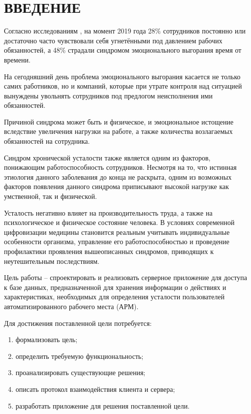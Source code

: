 \section*{ВВЕДЕНИЕ}

Согласно исследованиям \cite{burnout}, на момент 2019 года 28\% сотрудников постоянно или достаточно часто чувствовали себя угнетёнными под давлением рабочих обязанностей, а 48\% страдали синдромом эмоционального выгорания время от времени.

На сегодняшний день проблема эмоционального выгорания касается не только самих работников, но и компаний, которые при утрате контроля над ситуацией вынуждены увольнять сотрудников под предлогом неисполнения ими обязанностей. \cite{CompanyProblem}

Причиной синдрома может быть и физическое, и эмоциональное истощение вследствие увеличения нагрузки на работе, а также количества возлагаемых обязанностей на сотрудника. \cite{Prichini}

Синдром хронической усталости также является одним из факторов, понижающим работоспособность сотрудников. Несмотря на то, что истинная этиология данного заболевания до конца не раскрыта, одним из возможных факторов появления данного синдрома приписывают высокой нагрузке как умственной, так и физической. \cite{SHU}

Усталость негативно влияет на производительность труда, а также на психологическое и физическое состояние человека. В условиях современной цифровизации медицины становится реальным учитывать индивидуальные особенности организма, управление его работоспособностью и проведение профилактики проявления вышеописанных синдромов, приводящих к неутешительным последствиям.

Цель работы -- спроектировать и реализовать серверное приложение для доступа к базе данных, предназначенной для хранения информации о действиях и характеристиках, необходимых для определения усталости пользователей автоматизированного рабочего места (АРМ).

Для достижения поставленной цели потребуется:
\begin{enumerate}[leftmargin=1.6\parindent]
\item формализовать цель;
\item определить требуемую функциональность;
\item проанализировать существующие решения;
\item описать протокол взаимодействия клиента и сервера;
\item разработать приложение для решения поставленной цели.
\end{enumerate}

\pagebreak